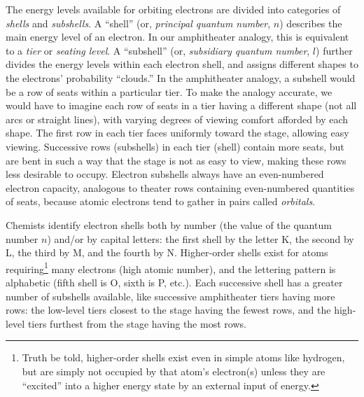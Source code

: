 The energy levels available for orbiting electrons are divided into categories of \textit{shells} and \textit{subshells}.  A ``shell'' (or, \textit{principal quantum number}, $n$) describes the main energy level of an electron.  In our amphitheater analogy, this is equivalent to a \textit{tier} or \textit{seating level}.  A ``subshell'' (or, \textit{subsidiary quantum number}, $l$) further divides the energy levels within each electron shell, and assigns different shapes to the electrons' probability ``clouds.''  In the amphitheater analogy, a subshell would be a row of seats within a particular tier.  To make the analogy accurate, we would have to imagine each row of seats in a tier having a different shape (not all arcs or straight lines), with varying degrees of viewing comfort afforded by each shape.  The first row in each tier faces uniformly toward the stage, allowing easy viewing.  Successive rows (subshells) in each tier (shell) contain more seats, but are bent in such a way that the stage is not as easy to view, making these rows less desirable to occupy.  Electron subshells always have an even-numbered electron capacity, analogous to theater rows containing even-numbered quantities of seats, because atomic electrons tend to gather in pairs called \textit{orbitals}.          

Chemists identify electron shells both by number (the value of the quantum number $n$) and/or by capital letters: the first shell by the letter K, the second by L, the third by M, and the fourth by N.  Higher-order shells exist for atoms requiring\footnote{Truth be told, higher-order shells exist even in simple atoms like hydrogen, but are simply not occupied by that atom's electron(s) unless they are ``excited'' into a higher energy state by an external input of energy.} many electrons (high atomic number), and the lettering pattern is alphabetic (fifth shell is O, sixth is P, etc.).  Each successive shell has a greater number of subshells available, like successive amphitheater tiers having more rows: the low-level tiers closest to the stage having the fewest rows, and the high-level tiers furthest from the stage having the most rows.

